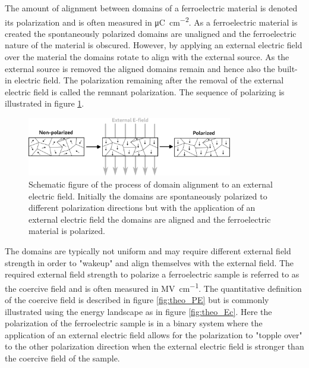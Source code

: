 \documentclass[11pt,twoside]{eitExjobb}
\begin{document}
The amount of alignment between domains of a ferroelectric material is denoted
its polarization and is often measured in
\si{\micro\coulomb\per\centi\meter\squared}. As a ferroelectric material is
created the spontaneously polarized domains are unaligned and the ferroelectric
nature of the material is obscured. However, by applying an external electric
field over the material the domains rotate to align with the external source.
As the external source is removed the aligned domains remain and hence also the
built-in electric field. The polarization remaining after the removal of the
external electric field is called the remnant polarization. The sequence of
polarizing is illustrated in figure \ref{fig:theo_domain}.

\begin{figure}[htbp]
    \centering
    \includegraphics[width=0.80\textwidth]{fig/img/polarized.png}
    \caption{Schematic figure of the process of domain alignment to an external
    electric field. Initially the domains are spontaneously polarized to
    different polarization directions but with the application of an external
    electric field the domains are aligned and the ferroelectric material is
    polarized.}
    \label{fig:theo_domain}
\end{figure}

The domains are typically not uniform and may require different external field
strength in order to "wakeup" and align themselves with the external field. The
required external field strength to polarize a ferroelectric sample is referred
to as the coercive field and is often measured in
\si{\mega\volt\per\centi\meter}. The quantitative definition of the coercive
field is described in figure \ref{fig:theo_PE} but is commonly illustrated
using the energy landscape as in figure \ref{fig:theo_Ec}. Here the
polarization of the ferroelectric sample is in a binary system where the
application of an external electric field allows for the polarization to
"topple over" to the other polarization direction when the external electric
field is stronger than the coercive field of the sample.
\end{document}
